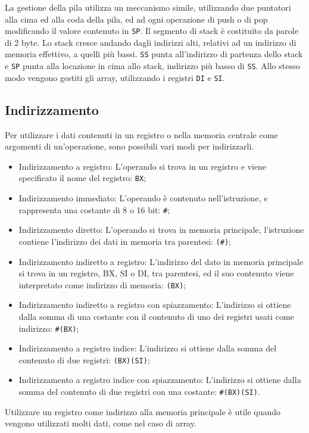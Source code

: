 \documentclass{article}
\numberwithin{equation}{subsection}
\begin{document}
La gestione della pila utilizza un meccanismo simile, utilizzando due puntatori alla cima ed alla coda della pila, ed ad ogni operazione di push o di pop modificando il valore 
contenuto in \verb|SP|. Il segmento di stack è costituito da parole di 2 byte. Lo stack cresce andando dagli indirizzi alti, relativi ad un indirizzo di memoria effettivo, a quelli più 
bassi. \verb|SS| punta all'indirizzo di partenza dello stack e \verb|SP| punta alla locazione in cima allo stack, indirizzo più basso di \verb|SS|. 
Allo stesso modo vengono gestiti gli array, utilizzando i registri \verb|DI| e \verb|SI|. 

\subsection{Indirizzamento}

Per utilizzare i dati contenuti in un registro o nella memoria centrale come argomenti di un'operazione, sono possibili vari modi per indirizzarli. 
\begin{itemize}
    \item Indirizzamento a registro: L'operando si trova in un registro e viene specificato il nome del registro: \verb|BX|;
    \item Indirizzamento immediato: L'operando è contenuto nell'istruzione, e rappresenta una costante di 8 o 16 bit: \verb|#|;
    \item Indirizzamento diretto: L'operando si trova in memoria principale, l'istruzione contiene l'indirizzo dei dati in memoria tra parentesi: \verb|(#)|;
    \item Indirizzamento indiretto a registro: L'indirizzo del dato in memoria principale si trova in un registro, BX, SI o DI, tra parentesi, ed il suo contenuto viene interpretato come indirizzo di memoria: \verb|(BX)|;
    \item Indirizzamento indiretto a registro con spiazzamento: L'indirizzo si ottiene dalla somma di una costante con il contenuto di uno dei registri usati come indirizzo: \verb|#(BX)|; 
    \item Indirizzamento a registro indice: L'indirizzo si ottiene dalla somma del contenuto di due registri: \verb|(BX)(SI)|;
    \item Indirizzamento a registro indice con spiazzamento: L'indirizzo si ottiene dalla somma del contenuto di due registri con una costante: \verb|#(BX)(SI)|. 
\end{itemize}
Utilizzare un registro come indirizzo alla memoria principale è utile quando vengono utilizzati molti dati, come nel caso di array. 
\end{document}
